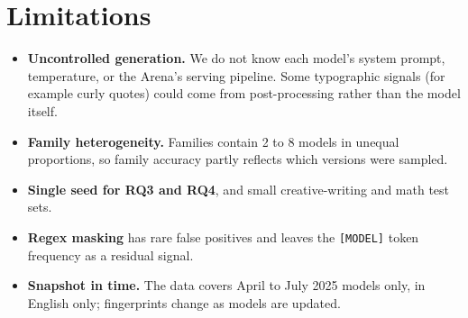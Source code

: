 \documentclass[11pt]{article}
\begin{document}
\section{Limitations}
\begin{itemize}
  \item \textbf{Uncontrolled generation.} We do not know each model's system prompt, temperature, or the Arena's serving pipeline. Some typographic signals (for example curly quotes) could come from post-processing rather than the model itself.
  \item \textbf{Family heterogeneity.} Families contain 2 to 8 models in unequal proportions, so family accuracy partly reflects which versions were sampled.
  \item \textbf{Single seed for RQ3 and RQ4}, and small creative-writing and math test sets.
  \item \textbf{Regex masking} has rare false positives and leaves the \texttt{[MODEL]} token frequency as a residual signal.
  \item \textbf{Snapshot in time.} The data covers April to July 2025 models only, in English only; fingerprints change as models are updated.
\end{itemize}

\end{document}
